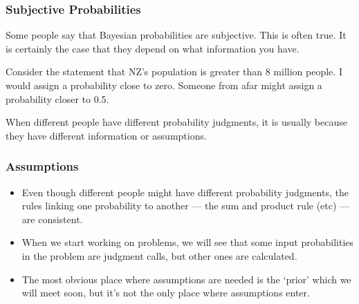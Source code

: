\documentclass{beamer}
\begin{document}
\begin{frame}
\frametitle{Subjective Probabilities}
Some people say that Bayesian probabilities are subjective.
This is often true. It is certainly the case
that they depend on what information you have.\\[0.3em]\pause

Consider the statement that NZ's population is greater than 8
million people. I would assign a probability close to zero.
Someone from afar might assign a probability closer to 0.5.\\[0.3em]\pause

When different people have different probability judgments,
it is usually because they have different information or assumptions.

\end{frame}


\begin{frame}
\frametitle{Assumptions}
\begin{itemize}
\item Even though different people might have different probability
judgments, the rules linking one probability to another --- the sum
and product rule (etc) --- are consistent.\\\pause
\item When we start working on problems, we will see that some
input probabilities in the problem
are judgment calls, but other ones are calculated.\\\pause
\item The most obvious place where assumptions are needed is the
`prior' which we will meet soon, but it's not the only place
where assumptions enter.
\end{itemize}

\end{frame}
\end{document}
